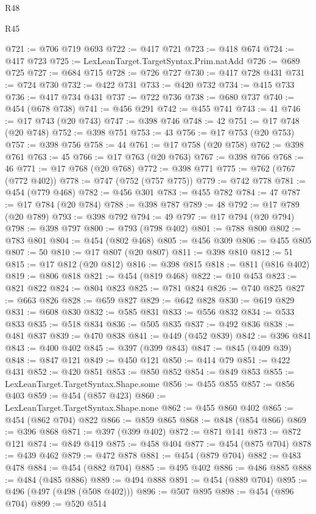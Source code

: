 \begin{lexlean}{R48}
\begin{lexlean}{R45}
\begin{coremodule}
{{{{{{{{{{{{{{{{{{{{{{{{{{{{{{{{{{{{{{{{{{{{{{{{{{{{{{{{{{{{{{{{{{{{{{{{{{{{{{{{{{{{{{{{{{{@721 := @706 @719 @693
@722 := @417 @721
@723 := @418 @674
@724 := @417 @723
@725 := LexLeanTarget.TargetSyntax.Prim.natAdd
@726 := @689 @725
@727 := @684 @715
@728 := @726 @727
@730 := @417 @728 @431
@731 := @724 @730
@732 := @422 @731
@733 := @420 @732
@734 := @415 @733
@736 := @417 @734 @431
@737 := @722 @736
@738 := @680 @737
@740 := @454 (@678 @738)
@741 := @456 @291
@742 := @455 @741
@743 := 41
@746 := @17 @743 (@20 @743)
@747 := @398 @746
@748 := 42
@751 := @17 @748 (@20 @748)
@752 := @398 @751
@753 := 43
@756 := @17 @753 (@20 @753)
@757 := @398 @756
@758 := 44
@761 := @17 @758 (@20 @758)
@762 := @398 @761
@763 := 45
@766 := @17 @763 (@20 @763)
@767 := @398 @766
@768 := 46
@771 := @17 @768 (@20 @768)
@772 := @398 @771
@775 := @762 (@767 (@772 @402))
@778 := @747 (@752 (@757 @775))
@779 := @742 @778
@781 := @454 (@779 @468)
@782 := @456 @301
@783 := @455 @782
@784 := 47
@787 := @17 @784 (@20 @784)
@788 := @398 @787
@789 := 48
@792 := @17 @789 (@20 @789)
@793 := @398 @792
@794 := 49
@797 := @17 @794 (@20 @794)
@798 := @398 @797
@800 := @793 (@798 @402)
@801 := @788 @800
@802 := @783 @801
@804 := @454 (@802 @468)
@805 := @456 @309
@806 := @455 @805
@807 := 50
@810 := @17 @807 (@20 @807)
@811 := @398 @810
@812 := 51
@815 := @17 @812 (@20 @812)
@816 := @398 @815
@818 := @811 (@816 @402)
@819 := @806 @818
@821 := @454 (@819 @468)
@822 := @10 @453
@823 := @821 @822
@824 := @804 @823
@825 := @781 @824
@826 := @740 @825
@827 := @663 @826
@828 := @659 @827
@829 := @642 @828
@830 := @619 @829
@831 := @608 @830
@832 := @585 @831
@833 := @556 @832
@834 := @533 @833
@835 := @518 @834
@836 := @505 @835
@837 := @492 @836
@838 := @481 @837
@839 := @470 @838
@841 := @449 (@452 @839)
@842 := @396 @841
@843 := @400 @402
@845 := @397 (@399 @843)
@847 := @845 (@409 @39)
@848 := @847 @121
@849 := @450 @121
@850 := @414 @79
@851 := @422 @431
@852 := @420 @851
@853 := @850 @852
@854 := @849 @853
@855 := LexLeanTarget.TargetSyntax.Shape.some
@856 := @455 @855
@857 := @856 @403
@859 := @454 (@857 @423)
@860 := LexLeanTarget.TargetSyntax.Shape.none
@862 := @455 @860 @402
@865 := @454 (@862 @704) @822
@866 := @859 @865
@868 := @848 (@854 @866)
@869 := @396 @868
@871 := @397 (@399 @402)
@872 := @871 @141
@873 := @872 @121
@874 := @849 @419
@875 := @458 @404
@877 := @454 (@875 @704)
@878 := @439 @462
@879 := @472 @878
@881 := @454 (@879 @704)
@882 := @483 @478
@884 := @454 (@882 @704)
@885 := @495 @402
@886 := @486 @885
@888 := @484 (@485 @886)
@889 := @494 @888
@891 := @454 (@889 @704)
@895 := @496 (@497 (@498 (@508 @402)))
@896 := @507 @895
@898 := @454 (@896 @704)
@899 := @520 @514
}}}}}}}}}}}}}}}}}}}}}}}}}}}}}}}}}}}}}}}}}}}}}}}}}}}}}}}}}}}}}}}}}}}}}}}}}}}}}}}}}}}}}}}}}}}
\end{coremodule}
\end{lexlean}
\end{lexlean}
